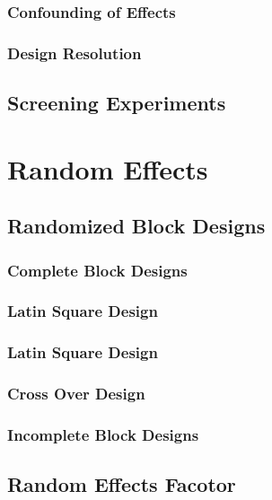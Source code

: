 \subsubsection{Confounding of Effects}

\subsubsection{Design Resolution}


\subsection{Screening Experiments}

\section{Random Effects}

\subsection{Randomized Block Designs}

\subsubsection{Complete Block Designs}


\subsubsection{Latin Square Design}

\subsubsection{Latin Square Design}

\subsubsection{Cross Over Design}

\subsubsection{Incomplete Block Designs}


\subsection{Random Effects Facotor}

